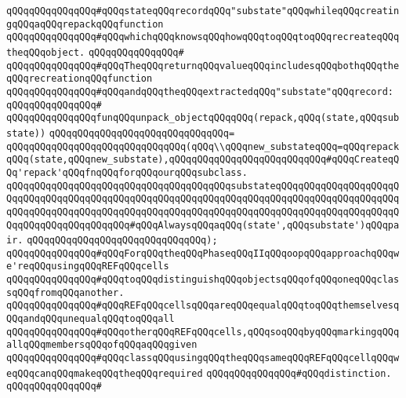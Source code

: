 \verb|qQQqqQQqqQQqqQQq#qQQqstateqQQqrecordqQQq"substate"qQQqwhileqQQqcreatingqQQqaqQQqrepackqQQqfunction|\newline
\verb|qQQqqQQqqQQqqQQq#qQQqwhichqQQqknowsqQQqhowqQQqtoqQQqtoqQQqrecreateqQQqtheqQQqobject.|\newline
\verb|qQQqqQQqqQQqqQQq#|\newline
\verb|qQQqqQQqqQQqqQQq#qQQqTheqQQqreturnqQQqvalueqQQqincludesqQQqbothqQQqtheqQQqrecreationqQQqfunction|\newline
\verb|qQQqqQQqqQQqqQQq#qQQqandqQQqtheqQQqextractedqQQq"substate"qQQqrecord:|\newline
\verb|qQQqqQQqqQQqqQQq#|\newline
\verb|qQQqqQQqqQQqqQQqfunqQQqunpack_objectqQQqqQQq(repack,qQQq(state,qQQqsubstate))|\newline
\verb|qQQqqQQqqQQqqQQqqQQqqQQqqQQqqQQq=|\newline
\verb|qQQqqQQqqQQqqQQqqQQqqQQqqQQqqQQq(qQQq\\qQQqnew_substateqQQq=qQQqrepackqQQq(state,qQQqnew_substate),qQQqqQQqqQQqqQQqqQQqqQQqqQQq#qQQqCreateqQQq'repack'qQQqfnqQQqforqQQqourqQQqsubclass.|\newline
\verb|qQQqqQQqqQQqqQQqqQQqqQQqqQQqqQQqqQQqqQQqsubstateqQQqqQQqqQQqqQQqqQQqqQQqqQQqqQQqqQQqqQQqqQQqqQQqqQQqqQQqqQQqqQQqqQQqqQQqqQQqqQQqqQQqqQQqqQQqqQQqqQQqqQQqqQQqqQQqqQQqqQQqqQQqqQQqqQQqqQQqqQQqqQQqqQQqqQQqqQQqqQQqqQQqqQQqqQQqqQQqqQQqqQQq#qQQqAlwaysqQQqaqQQq(state',qQQqsubstate')qQQqpair.|\newline
\verb|qQQqqQQqqQQqqQQqqQQqqQQqqQQqqQQq);|\newline
\newline
\verb|qQQqqQQqqQQqqQQq#qQQqForqQQqtheqQQqPhaseqQQqIIqQQqoopqQQqapproachqQQqwe'reqQQqusingqQQqREFqQQqcells|\newline
\verb|qQQqqQQqqQQqqQQq#qQQqtoqQQqdistinguishqQQqobjectsqQQqofqQQqoneqQQqclassqQQqfromqQQqanother.|\newline
\verb|qQQqqQQqqQQqqQQq#qQQqREFqQQqcellsqQQqareqQQqequalqQQqtoqQQqthemselvesqQQqandqQQqunequalqQQqtoqQQqall|\newline
\verb|qQQqqQQqqQQqqQQq#qQQqotherqQQqREFqQQqcells,qQQqsoqQQqbyqQQqmarkingqQQqallqQQqmembersqQQqofqQQqaqQQqgiven|\newline
\verb|qQQqqQQqqQQqqQQq#qQQqclassqQQqusingqQQqtheqQQqsameqQQqREFqQQqcellqQQqweqQQqcanqQQqmakeqQQqtheqQQqrequired|\newline
\verb|qQQqqQQqqQQqqQQq#qQQqdistinction.|\newline
\verb|qQQqqQQqqQQqqQQq#|\newline
